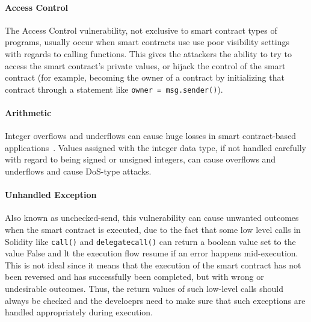             \paragraph{Access Control}
            The Access Control vulnerability, not exclusive to smart contract types of programs, usually occur when smart contracts use use poor visibility settings with regards to calling functions.
            This gives the attackers the ability to try to access the smart contract's private values, or hijack the control of the smart contract (for example, becoming the owner of a contract by initializing that contract through a statement like \texttt{owner = msg.sender()}).

            \paragraph{Arithmetic}
            Integer overflows and underflows can cause huge losses in smart contract-based applications~\cite{arithmeticVuln}.
            Values assigned with the integer data type, if not handled carefully with regard to being signed or unsigned integers, can cause overflows and underflows and cause DoS-type attacks.
            
            \paragraph{Unhandled Exception}
            Also known as unchecked-send, this vulnerability  can cause unwanted outcomes when the smart contract is executed, due to the fact that some low level calls in Solidity like \texttt{call()} and \texttt{delegatecall()} can return a boolean value set to the value False and lt the execution flow resume if an error happens mid-execution.
            This is not ideal since it means that the execution of the smart contract has not been reversed and has successfully been completed, but with wrong or undesirable outcomes.
            Thus, the return values of such low-level calls should always be checked and the develoeprs need to make sure that such exceptions are handled appropriately during execution.
            
